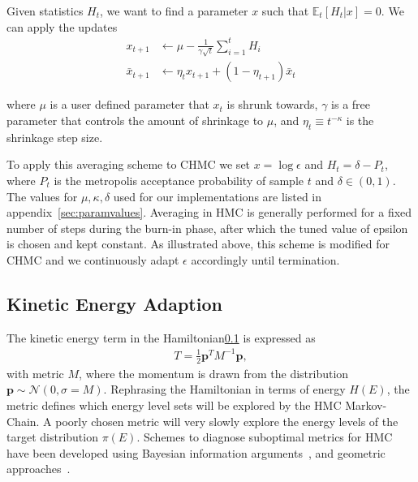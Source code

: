 \documentclass[11pt]{article}
\begin{document}
    Given statistics $H_t$, we want to find a parameter $x$ such that $\mathbb{E}_t[H_t|x] = 0$.
    We can apply the updates
    \begin{equation}\label{eq:dual_averaging}
    \begin{aligned}
        x_{t+1} &\gets \mu - \frac{1}{\gamma \sqrt{t}} \sum_{i=1}^t H_i \\
        \bar{x}_{t+1} &\gets \eta_t x_{t+1} + (1 - \eta_{t+1}) \bar{x}_t
    \end{aligned}
    \end{equation}

    where $\mu$ is a user defined parameter that $x_t$ is shrunk towards, $\gamma$ is a free parameter that controls
    the amount of shrinkage to $\mu$, and $\eta_t \equiv t^{-\kappa}$ is the shrinkage step size.

    To apply this averaging scheme to CHMC we set $x = \log{\epsilon}$ and $H_t = \delta - P_t$, where $P_t$ is the
    metropolis acceptance probability of sample $t$ and $\delta \in (0, 1)$.
    The values for $\mu, \kappa, \delta$ used for our implementations are listed in appendix~\ref{sec:paramvalues}.
    Averaging in HMC is generally performed for a fixed number of steps during the burn-in phase, after which the
    tuned value of epsilon is chosen and kept constant.
    As illustrated above, this scheme is modified for CHMC and we continuously adapt $\epsilon$ accordingly until termination.


    \subsection{Kinetic Energy Adaption}
    The kinetic energy term in the Hamiltonian\ref{} is expressed as
    \begin{equation}\label{eq:kinetic_energy}
    \begin{aligned}
        T = \frac{1}{2} \mathbf{p}^T M^{-1} \mathbf{p},
    \end{aligned}
    \end{equation}
    with metric $M$, where the momentum is drawn from the distribution $\mathbf{p} \sim \mathcal{N}(0, \sigma = M)$.
    Rephrasing the Hamiltonian in terms of energy $H(E)$, the metric defines which energy level sets will be explored
    by the HMC Markov-Chain.
    A poorly chosen metric will very slowly explore the energy levels of the target distribution $\pi(E)$.
    Schemes to diagnose suboptimal metrics for HMC have been developed using Bayesian information
    arguments~\cite{betancourt2016energymetric}, and geometric approaches~\cite{bales2019_hmc_metric}.
\end{document}
